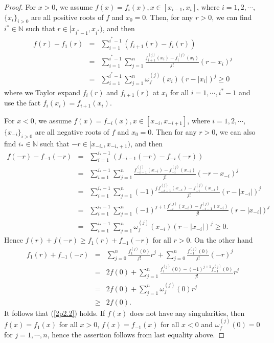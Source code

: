 \documentclass{article}
\begin{document}
\begin{proof}
    For $x>0$, we assume $f(x)=f_{i}(x), x\in[x_{i-1}, x_{i}]$, where $i=1, 2, \cdots,$ $\{x_{i}\}_{i>0}$ are all positive roots of $f$ and $x_{0}=0$. Then, for any $r>0$, we can find $i^{*}\in\mathbb{N}$ such that $r\in [x_{i^{*}-1}, x_{i^{*}})$, and then
    \begin{eqnarray}\label{2aa1}
        f(r)-f_{1}(r)&=&\sum_{i=1}^{i^{*}-1}(f_{i+1}(r)-f_{i}(r))\nonumber\\
        &=&\sum_{i=1}^{i^{*}-1}\sum_{j=1}^{n}\frac{f_{i+1}^{(j)}(x_{i})-f_{i}^{(j)}(x_{i})}{j!}(r-x_{i})^{j}\nonumber\\
        &=&\sum_{i=1}^{i^{*}-1}\sum_{j=1}^{n}\omega_{f}^{(j)}(x_{i})(r-|x_{i}|)^{j}\geq 0
    \end{eqnarray}
     where we Taylor expand $f_{i}(r)$ and $f_{i+1}(r)$ at $x_{i}$ for all $i=1, \cdots, i^{*}-1$ and use the fact $f_{i}(x_{i})=f_{i+1}(x_{i})$.
     
     For $x<0$, we assume $f(x)=f_{-i}(x), x\in[x_{-i}, x_{-i+1}]$, where $i=1, 2, \cdots,$ $\{x_{-i}\}_{i>0}$ are all negative roots of $f$ and $x_{0}=0$. Then for any $r>0$, we can also find $i_{*}\in\mathbb{N}$ such that $-r\in [x_{-i_{*}}, x_{-i_{*}+1})$, and then
    \begin{eqnarray}\label{2aa2}
        f(-r)-f_{-1}(-r)&=&\sum_{i=1}^{i_{*}-1}(f_{-i-1}(-r)-f_{-i}(-r))\nonumber\\
        &=&\sum_{i=1}^{i_{*}-1}\sum_{j=1}^{n}\frac{f_{-i-1}^{(j)}(x_{-i})-f_{-i}^{(j)}(x_{-i})}{j!}(-r-x_{-i})^{j}\nonumber\\
        &=&\sum_{i=1}^{i_{*}-1}\sum_{j=1}^{n}(-1)^{j}\frac{f_{-i-1}^{(j)}(x_{-i})-f_{-i}^{(j)}(x_{-i})}{j!}(r-|x_{-i}|)^{j}\nonumber\\
        &=&\sum_{i=1}^{i_{*}-1}\sum_{j=1}^{n}(-1)^{j+1}\frac{f_{-i}^{(j)}(x_{-i})-f_{-i-1}^{(j)}(x_{-i})}{j!}(r-|x_{-i}|)^{j}\nonumber\\
        &=&\sum_{i=1}^{i_{*}-1}\sum_{j=1}^{n}\omega_{f}^{(j)}(x_{-i})(r-|x_{-i}|)^{j}\geq 0.
    \end{eqnarray}
    Hence $f(r)+f(-r)\geq f_{1}(r)+f_{-1}(-r)$ for all $r>0$. On the other hand
    \begin{eqnarray}\label{2aa3}
        f_{1}(r)+f_{-1}(-r)&=&\sum_{j=0}^{n}\frac{f_{1}^{(j)}(0)}{j!}r^{j}+\sum_{j=0}^{n}\frac{f_{-1}^{(j)}(0)}{j!}(-r)^{j}\nonumber\\
        &=&2f(0)+\sum_{j=1}^{n}\frac{f_{1}^{(j)}(0)-(-1)^{j+1}f_{-1}^{(j)}(0)}{j!}r^{j}\nonumber\\
        &=&2f(0)+\sum_{j=1}^{n}\omega_{f}^{(j)}(0)r^{j}\nonumber\\
        &\geq& 2f(0).
    \end{eqnarray}
    It follows that (\ref{2p2.2}) holds. If $f(x)$ does not have any singularities, then $f(x)=f_{1}(x)$ for all $x>0$, $f(x)=f_{-1}(x)$ for all $x<0$ and $\omega_{f}^{(j)}(0)=0$ for $j=1, \cdots, n$, hence the assertion follows from last equality above.
\end{proof}
\end{document}
